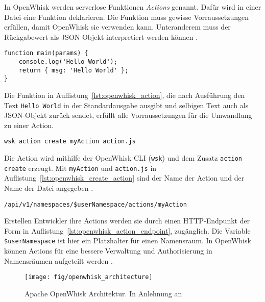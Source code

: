 In OpenWhisk werden serverlose Funktionen \emph{Actions} genannt.
Dafür wird in einer Datei eine Funktion deklarieren.
Die Funktion muss gewisse Vorraussetzungen erfüllen,
damit OpenWhisk sie verwenden kann.
Unteranderem muss der Rückgabewert als JSON Objekt
interpretiert werden können \cite{OpenWhiskGithubActions}.\\

\begin{lstlisting}[caption={Hello World JS Funktion. In Anlehnung an \cite{OpenWhiskGithub} \cite{OpenWhiskGithubActions}}, label={lst:openwhisk_action}]
function main(params) {
    console.log('Hello World');
    return { msg: 'Hello World' };
}
\end{lstlisting}

Die Funktion in Auflistung~\ref{lst:openwhisk_action},
die nach Ausführung den Text \texttt{Hello World}
in der Standardausgabe ausgibt und selbigen Text
auch als JSON-Objekt zurück sendet, erfüllt alle Vorraussetzungen
für die Umwandlung zu einer Action.\\

\begin{lstlisting}[caption=Erstellen einer Action \cite{OpenWhiskGithub}, label={lst:openwhisk_create_action}]
wsk action create myAction action.js
\end{lstlisting}

Die Action wird mithilfe der OpenWhisk CLI (\texttt{wsk})
und dem Zusatz \texttt{action create} erzeugt.
Mit \texttt{myAction} und \texttt{action.js} 
in Auflistung~\ref{lst:openwhisk_create_action}
sind der Name der Action und der Name der Datei angegeben
\cite{OpenWhiskGithub}.\\

\begin{lstlisting}[caption=Action Endpunkt \cite{OpenWhiskGithub}, label={lst:openwhisk_action_endpoint}]
/api/v1/namespaces/$userNamespace/actions/myAction
\end{lstlisting}

Erstellen Entwickler ihre Actions werden sie durch
einen HTTP-Endpunkt der Form in Auflistung~\ref{lst:openwhisk_action_endpoint},
zugänglich.
Die Variable \texttt{\$userNamespace} ist hier ein
Platzhalter für einen Namensraum.
In OpenWhisk können Actions für eine bessere
Verwaltung und Authorisierung in Namensräumen aufgeteilt werden
\cite{OpenWhiskGithub}.

\begin{figure}
    \centering
    \texttt{[image: fig/openwhisk\_architecture]}
    \caption{Apache OpenWhisk Architektur. In Anlehnung an \cite{OpenWhiskGithub}}
    \label{fig:openwhisk_architecture}
\end{figure}

